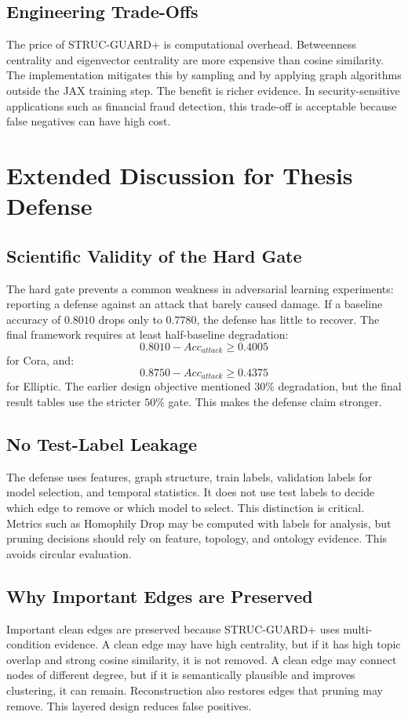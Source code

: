 \documentclass[12pt,oneside]{report}
\begin{document}
\section{Engineering Trade-Offs}
The price of STRUC-GUARD+ is computational overhead. Betweenness centrality and eigenvector centrality are more expensive than cosine similarity. The implementation mitigates this by sampling and by applying graph algorithms outside the JAX training step. The benefit is richer evidence. In security-sensitive applications such as financial fraud detection, this trade-off is acceptable because false negatives can have high cost.

\chapter{Extended Discussion for Thesis Defense}

\section{Scientific Validity of the Hard Gate}
The hard gate prevents a common weakness in adversarial learning experiments: reporting a defense against an attack that barely caused damage. If a baseline accuracy of $0.8010$ drops only to $0.7780$, the defense has little to recover. The final framework requires at least half-baseline degradation:
$$
0.8010-Acc_{attack}\geq 0.4005
$$
for Cora, and:
$$
0.8750-Acc_{attack}\geq 0.4375
$$
for Elliptic. The earlier design objective mentioned $30\%$ degradation, but the final result tables use the stricter $50\%$ gate. This makes the defense claim stronger.

\section{No Test-Label Leakage}
The defense uses features, graph structure, train labels, validation labels for model selection, and temporal statistics. It does not use test labels to decide which edge to remove or which model to select. This distinction is critical. Metrics such as Homophily Drop may be computed with labels for analysis, but pruning decisions should rely on feature, topology, and ontology evidence. This avoids circular evaluation.

\section{Why Important Edges are Preserved}
Important clean edges are preserved because STRUC-GUARD+ uses multi-condition evidence. A clean edge may have high centrality, but if it has high topic overlap and strong cosine similarity, it is not removed. A clean edge may connect nodes of different degree, but if it is semantically plausible and improves clustering, it can remain. Reconstruction also restores edges that pruning may remove. This layered design reduces false positives.
\end{document}
